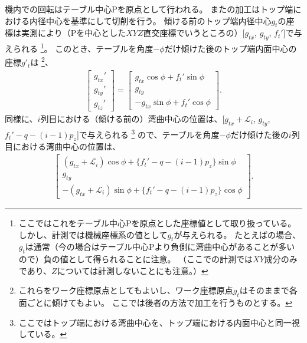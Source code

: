 \clearpage
機内での回転はテーブル中心Pを原点として行われる。
また\dimple の加工はトップ端における内径中心を基準にして切削を行う。
傾ける前のトップ端内径中心$g_t$の座標は実測により（Pを中心とした$XYZ$直交座標でいうところの）[$g_{tx}$, $g_{ty}$, $f_t'$]で与えられる
\footnote{ここではこれをテーブル中心Pを原点とした座標値として取り扱っている。
しかし、計測では機械座標系の値として$g_t$が与えられる。
たとえば\DMname の場合、$g_t$は通常（今の場合はテーブル中心Pより負側に湾曲中心があることが多いので）負の値として得られることに注意。
（ここでの計測では$XY$成分のみであり、$Z$については計測しないことにも注意。）}。
このとき、テーブルを角度$-\phi$だけ傾けた後のトップ端内面中心の座標$g'_t$は
\footnote{これらをワーク座標原点としてもよいし、ワーク座標原点$g_t$はそのままで各面ごとに傾けてもよい。
ここでは後者の方法で加工を行うものとする。}、
\begin{align}
  \label{eq:afterPhiTCenterFromO}
  \left[
  \begin{array}{c}
    g_{tx}'\\
    g_{ty}'\\
    g_{tz}'
  \end{array}
  \right]
  =\left[
   \begin{array}{c}
     g_{tx}\cos\phi+f_t'\sin\phi\\
     g_{ty}\\
     -g_{tx}\sin\phi+f_t'\cos\phi
   \end{array}
   \right].
   \end{align}
同様に、$i$列目における（傾ける前の）湾曲中心の位置は、[$g_{tx}+\mathcal L_i$, $g_{ty}$, $f_t'-q-(i-1)p_z$]で与えられる
\footnote{ここではトップ端における湾曲中心を、トップ端における内面中心と同一視している。}
ので、テーブルを角度$-\phi$だけ傾けた後の$i$列目における湾曲中心の位置は、
\begin{align*}
  \left[
  \begin{array}{c}
    (g_{tx}+\mathcal L_i)\cos\phi+\{f_t'-q-(i-1)p_z\}\sin\phi\\
    g_{ty}\\
    -(g_{tx}+\mathcal L_i)\sin\phi+\{f_t'-q-(i-1)p_z\}\cos\phi
  \end{array}
  \right].
\end{align*}
